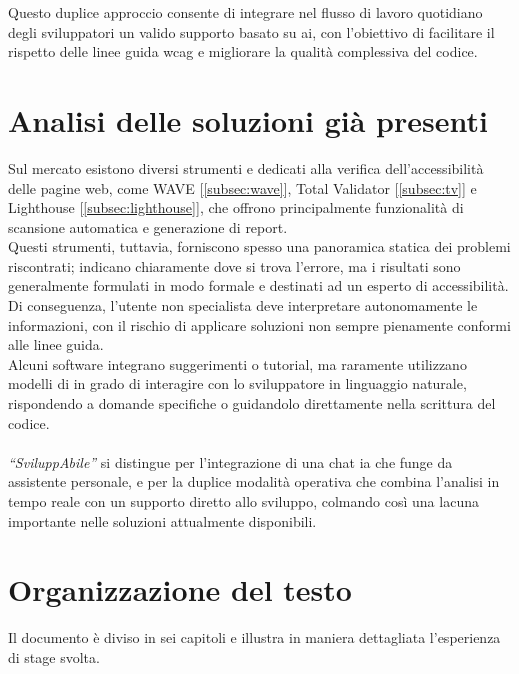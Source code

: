 Questo duplice approccio consente di integrare nel flusso di lavoro quotidiano degli sviluppatori un valido supporto basato su \acrshort{ai}, con l’obiettivo di facilitare il rispetto delle linee guida \acrshort{wcag} e migliorare la qualità complessiva del codice.

\section{Analisi delle soluzioni già presenti}
\noindent Sul mercato esistono diversi strumenti e  dedicati alla verifica dell’accessibilità delle pagine web, come WAVE [\ref{subsec:wave}], Total Validator [\ref{subsec:tv}] e Lighthouse [\ref{subsec:lighthouse}], che offrono principalmente funzionalità di scansione automatica e generazione di report.\\ 
Questi strumenti, tuttavia, forniscono spesso una panoramica statica dei problemi riscontrati; indicano chiaramente dove si trova l’errore, ma i risultati sono generalmente formulati in modo formale e destinati ad un esperto di accessibilità. Di conseguenza, l’utente non specialista deve interpretare autonomamente le informazioni, con il rischio di applicare soluzioni non sempre pienamente conformi alle linee guida.\\ 
Alcuni software integrano suggerimenti o tutorial, ma raramente utilizzano modelli di  in grado di interagire con lo sviluppatore in linguaggio naturale, rispondendo a domande specifiche o guidandolo direttamente nella scrittura del codice. \\
\\
\textit{“SviluppAbile”} si distingue per l’integrazione di una chat \acrshort{ia} che funge da assistente personale, e per la duplice modalità operativa che combina l’analisi in tempo reale con un supporto diretto allo sviluppo, colmando così una lacuna importante nelle soluzioni attualmente disponibili.

\section{Organizzazione del testo}
\noindent Il documento è diviso in sei capitoli e illustra in maniera dettagliata l’esperienza di stage svolta.

